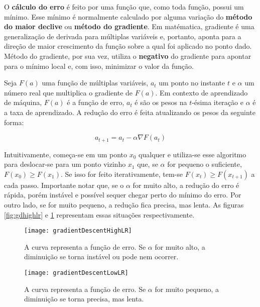 O \textbf{cálculo do erro} é feito por uma função que, como toda função, possui um mínimo.
Esse mínimo é normalmente calculado por alguma variação do \textbf{método do maior declive} ou \textbf{método do gradiente}.
Em matématica, gradiente é uma generalização de derivada para múltiplas variáveis e, portanto, aponta para a direção de maior crescimento da função sobre a qual foi aplicado no ponto dado.
Método do gradiente, por sua vez, utiliza o \textbf{negativo} do gradiente para apontar para o mínimo local e, com isso, minimizar o valor da função.

Seja $F(a)$ uma função de múltiplas variáveis, $a_{t}$ um ponto no instante $t$ e $\alpha$ um número real que multiplica o gradiente de $F(a)$.
Em contexto de aprendizado de máquina, $F(a)$ é a função de erro, $a_{t}$ é são os pesos na $t$-ésima iteração e $\alpha$ é a taxa de aprendizado.
A redução do erro é feita atualizando os pesos da seguinte forma:

\begin{equation} \label{eq:w_update}
a_{t+1} = a_{t} - \alpha \nabla F(a_{t})
\end{equation}

Intuitivamente, começa-se em um ponto $x_{0}$ qualquer e utiliza-se esse algoritmo para deslocar-se para um ponto vizinho $x_{1}$ que, se $\alpha$ for pequeno o suficiente, $F(x_{0}) \geq F(x_{1})$.
Se isso for feito iterativamente, tem-se $F(x_{t}) \geq F(x_{t+1})$ a cada passo.
Importante notar que, se o $\alpha$ for muito alto, a redução do erro é rápida, porém instável e  possível sequer chegar perto do mínimo do erro.
Por outro lado, se for muito pequeno, a redução fica precisa, mas lenta.
As figuras \ref{fig:gdhighlr} e \ref{fig:gdlowlr} representam essas situações respectivamente.

\begin{figure}[h!]
  \label{fig:gradientDescent}
  \begin{minipage}[b]{.5\textwidth}
  \centering
  \texttt{[image: gradientDescentHighLR]}
  \caption{A curva representa a função de erro. Se $\alpha$ for muito alto, a diminuição se torna instável ou pode nem ocorrer.}
  \label{fig:gdhighlr}
  \end{minipage}
  \hfill
  \begin{minipage}[b]{.5\textwidth}
  \centering
  \texttt{[image: gradientDescentLowLR]}
  \caption{A curva representa a função de erro. Se $\alpha$ for muito pequeno, a diminuição se torna precisa, mas lenta.}
  \label{fig:gdlowlr}
  \end{minipage}
\end{figure}

